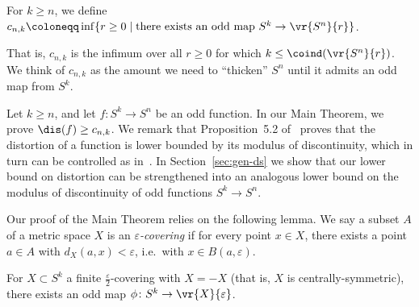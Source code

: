\documentclass[11pt, reqno, english]{amsart}
\begin{document}
\begin{definition-cnk}
For $k\ge n$, we define $c_{n,k} \coloneqq \inf\{r\ge 0 \mid \text{there exists an odd map }S^k \to \vr{S^n}{r}\}$.
\end{definition-cnk}

That is, $c_{n,k}$ is the infimum over all $r\ge 0$ for which $k\le \coind(\vr{S^n}{r})$.
We think of $c_{n,k}$ as the amount we need to ``thicken'' $S^n$ until it admits an odd map from $S^k$.

Let $k\ge n$, and let $f\colon S^k \to S^n$ be an odd function.
In our Main Theorem, we prove $\dis(f)\geq c_{n, k}$.
We remark that Proposition~5.2 of~\cite{lim2021gromov} proves that the distortion of a function is lower bounded by its modulus of discontinuity, which in turn can be controlled as in~\cite{dubins1981equidiscontinuity}.
In Section~\ref{sec:gen-ds} we show that our lower bound on distortion can be strengthened into an analogous lower bound on the modulus of discontinuity of odd functions $S^k \to S^n$.

Our proof of the Main Theorem relies on the following lemma.
We say a subset $A$ of a metric space $X$ is an \emph{$\varepsilon$-covering} if for every point $x\in X$, there exists a point $a\in A$ with $d_X(a,x)<\varepsilon$, i.e.\ with $x \in B(a,\varepsilon)$.

\begin{lemma}\label{lem:covering}
For $X \subset S^k$ a finite $\tfrac{\varepsilon}{2}$-covering with $X=-X$ (that is, $X$ is centrally-symmetric), there exists an odd map
$\phi \colon S^k \to \vr{X}{\varepsilon}$.
\end{lemma}
\end{document}
